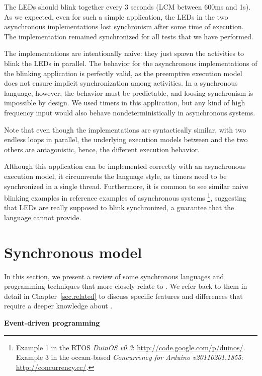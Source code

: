 The LEDs should blink together every 3 seconds (LCM between 600ms and 1s).
As we expected, even for such a simple application, the LEDs in the two 
asynchronous implementations lost synchronism after some time of execution.
The \CEU{} implementation remained synchronized for all tests that we have 
performed.

The implementations are intentionally naive: they just spawn the activities to 
blink the LEDs in parallel.
The behavior for the asynchronous implementations of the blinking application 
is perfectly valid, as the preemptive execution model does not ensure implicit 
synchronization among activities.
In a synchronous language, however, the behavior must be predictable, and 
loosing synchronism is impossible by design.
We used timers in this application, but any kind of high frequency input would 
also behave nondeterministically in asynchronous systems.

Note that even though the implementations are syntactically similar, with two 
endless loops in parallel, the underlying execution models between \CEU and the 
two others are antagonistic, hence, the different execution behavior.

Although this application can be implemented correctly with an asynchronous 
execution model, it circumvents the language style, as timers need to be 
synchronized in a single thread.
Furthermore, it is common to see similar naive blinking examples in reference 
examples of asynchronous systems%
\footnote{
Example 1 in the RTOS \emph{DuinOS v0.3}:
\url{http://code.google.com/p/duinos/}.\\
Example 3 in the occam-based \emph{Concurrency for Arduino v20110201.1855}:
\url{http://concurrency.cc/}.
}, suggesting that LEDs are really supposed to blink synchronized, a guarantee 
that the language cannot provide.


\section{Synchronous model}

In this section, we present a review of some synchronous languages and 
programming techniques that more closely relate to \CEU.
%
We refer back to them in detail in Chapter~\ref{sec.related} to discuss 
specific features and differences that require a deeper knowledge about \CEU.

\textbf{Event-driven programming}

